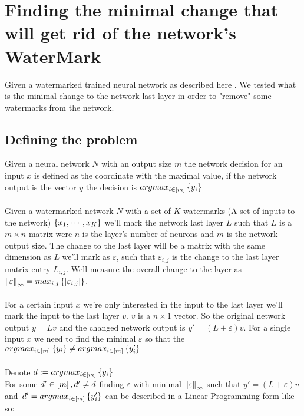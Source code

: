 \documentclass[a4paper]{llncs}
\newcommand{\guy}[1]{\marginpar{\textcolor{orange}{Guy: #1}}}
\begin{document}
\section{Finding the minimal change that will get rid of the network's WaterMark}
\label{sec:verifyWatermarks}

Given a watermarked trained neural network as described
here \cite{AdBaPiKeWatermarking}.
\guy{make this a proper citation}
We
tested what is the minimal change to the network last layer in order
to "remove" some watermarks from the network.


\subsection{Defining the problem}
Given a neural network $N$ with an output size $m$ the network
decision for an input $x$ is defined as the coordinate with the
maximal value, if the network output is the vector $y$ the decision is
$argmax_{i\in \left[m\right]} \left\lbrace y_i\right\rbrace$
\\\\
Given a watermarked network $N$ with a set of $K$ watermarks (A set of
inputs to the network) $\left\lbrace x_1,\cdots,x_K\right\rbrace$ we'll mark the
network last layer $L$ such that $L$ is a $m\times n$ matrix were $n$
is the layer's number of neurons and $m$ is the network output size.
The change to the last layer will be a matrix with the same dimension
as $L$ we'll mark as $\varepsilon$, such that $\varepsilon_{i,j}$ is
the change to the last layer matrix entry $L_{i,j}$. Well measure the
overall change to the layer as
$\left\lVert\varepsilon\right\rVert_{\infty} =
max_{i,j}\left\lbrace \left\lvert\varepsilon_{i,j}\right\rvert\right\rbrace$.
\\\\
For a certain input $x$ we're only interested in the input to the last
layer we'll mark the input to the last layer $v$. $v$ is a $n\times 1$
vector.  So the original network output $y = Lv$ and the changed
network output is $y' = (L+\varepsilon)v$. For a single input $x$ we
need to find the minimal $\varepsilon$ so that the
$argmax_{i\in\left[m\right]}\left\lbrace y_i\right\rbrace\neq
argmax_{i\in\left[m\right]}\left\lbrace y'_i\right\rbrace$
\\\\
Denote $d := argmax_{i\in \left[m\right]} \left\lbrace y_i\right\rbrace$ \\
For some $d'\in\left[m\right],d'\neq d$ finding $\varepsilon$ with
minimal $\left\lVert\varepsilon\right\rVert_{\infty}$ such that
$y' = (L+\varepsilon)v\,$ and
$\,d' = argmax_{i\in\left[m\right]}\left\lbrace y'_i\right\rbrace$ can be described
in a Linear Programming form like so:
\end{document}
